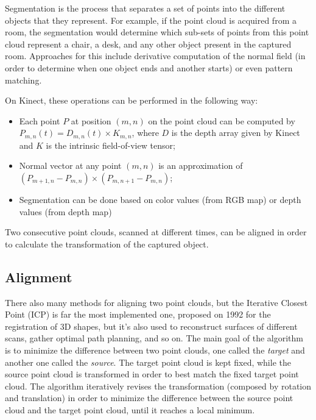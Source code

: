 \documentclass[msc, a4paper, classic, en]{ufbathesis}
\begin{document}
Segmentation is the process that separates a set of points into the different objects that they represent. For example, if the point cloud is acquired from a room, the segmentation would determine which sub-sets of points from this point cloud represent a chair, a desk, and any other object present in the captured room. Approaches for this include derivative computation of the normal field (in order to determine when one object ends and another starts) or even pattern matching.

On Kinect, these operations can be performed in the following way:

\begin{itemize}
  \item Each point $P$ at position $(m, n)$ on the point cloud can be computed by $P_{m, n}(t) = D_{m, n}(t) \times K_{m, n}$, where $D$ is the depth array given by Kinect and $K$ is the intrinsic field-of-view tensor;
  \item Normal vector at any point $(m, n)$ is an approximation of $(P_{m+1, n} - P_{m,n}) \times (P_{m, n+1} - P_{m,n})$;
  \item Segmentation can be done based on color values (from RGB map) or depth values (from depth map)
\end{itemize}

Two consecutive point clouds, scanned at different times, can be aligned in order to calculate the transformation of the captured object.

\subsection{Alignment}
\label{sec:icp}

There also many methods for aligning two point clouds, but the Iterative Closest Point (ICP) \cite{icp} is far the most implemented one, proposed on 1992 for the registration of 3D shapes, but it's also used to reconstruct surfaces of different scans, gather optimal path planning, and so on. The main goal of the algorithm is to minimize the difference between two point clouds, one called the \textit{target} and another one called the \textit{source}. The target point cloud is kept fixed, while the source point cloud is transformed in order to best match the fixed target point cloud. The algorithm iteratively revises the transformation (composed by rotation and translation) in order to minimize the difference between the source point cloud and the target point cloud, until it reaches a local minimum.
\end{document}
